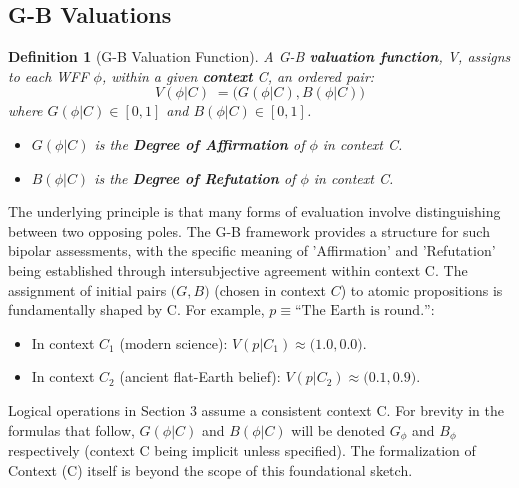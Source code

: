 \documentclass[11pt]{article}
\newcommand{\GB}[2]{\bigl(#1,#2\bigr)} %
\newtheorem{definition}{Definition}[section]
\theoremstyle{remark}
\begin{document}
\subsection{G-B Valuations}
\begin{definition}[G-B Valuation Function] \label{def:gb_valuation}
A G-B \textbf{valuation function}, V, assigns to each WFF $\phi$, within a given \textbf{context} C, an ordered pair:
$$V(\phi|C) \;= \GB{G(\phi|C)}{B(\phi|C)}$$ %
where $G(\phi|C) \in [0,1]$ and $B(\phi|C) \in [0,1]$.
\begin{itemize}
    \item $G(\phi|C)$ is the \textbf{Degree of Affirmation} of $\phi$ in context C.
    \item $B(\phi|C)$ is the \textbf{Degree of Refutation} of $\phi$ in context C.
\end{itemize}
\end{definition}
The underlying principle is that many forms of evaluation involve distinguishing between two opposing poles. The G-B framework provides a structure for such bipolar assessments, with the specific meaning of 'Affirmation' and 'Refutation' being established through intersubjective agreement within context C. The assignment of initial pairs $\GB{G}{B}$ (chosen in context $C$) to atomic propositions is fundamentally shaped by C. For example, $p \equiv \text{``The Earth is round.''}$: %
\begin{itemize}
    \item In context $C_1$ (modern science): $V(p|C_1) \approx \GB{1.0}{0.0}$.
    \item In context $C_2$ (ancient flat-Earth belief): $V(p|C_2) \approx \GB{0.1}{0.9}$.
\end{itemize}
Logical operations in Section 3 assume a consistent context C. For brevity in the formulas that follow, $G(\phi|C)$ and $B(\phi|C)$ will be denoted $G_\phi$ and $B_\phi$ respectively (context C being implicit unless specified). The formalization of Context (C) itself is beyond the scope of this foundational sketch.
\end{document}
